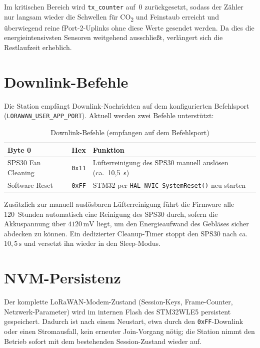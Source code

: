 Im kritischen Bereich wird \texttt{tx\_counter} auf~0 zurückgesetzt, sodass der Zähler nur langsam wieder die Schwellen für CO\textsubscript{2} und Feinstaub erreicht und überwiegend reine fPort-2-Uplinks ohne diese Werte gesendet werden. Da dies die energieintensivsten Sensoren weitgehend ausschließt, verlängert sich die Restlaufzeit erheblich.

\section*{Downlink-Befehle}

Die Station empfängt Downlink-Nachrichten auf dem konfigurierten Befehlsport (\texttt{LORAWAN\_USER\_APP\_PORT}). Aktuell werden zwei Befehle unterstützt:

\begin{table}[H]
  \centering
  \begin{tabular}{lll}
    \hline
    \textbf{Byte 0} & \textbf{Hex} & \textbf{Funktion} \\
    \hline
    SPS30 Fan Cleaning & \texttt{0x11} & Lüfterreinigung des SPS30 manuell auslösen (ca.\ 10{,}5~s) \\
    Software Reset      & \texttt{0xFF} & STM32 per \texttt{HAL\_NVIC\_SystemReset()} neu starten \\
    \hline
  \end{tabular}
  \caption{Downlink-Befehle (empfangen auf dem Befehlsport)}
  \label{tab:downlink}
\end{table}

Zusätzlich zur manuell auslösbaren Lüfterreinigung führt die Firmware alle 120~Stunden automatisch eine Reinigung des SPS30 durch, sofern die Akkuspannung über $4120\,\text{mV}$ liegt, um den Energieaufwand des Gebläses sicher abdecken zu können. Ein dedizierter Cleanup-Timer stoppt den SPS30 nach ca.\ $10{,}5\,\text{s}$ und versetzt ihn wieder in den Sleep-Modus.

\section*{NVM-Persistenz}

Der komplette LoRaWAN-Modem-Zustand (Session-Keys, Frame-Counter, Netzwerk-Parameter) wird im internen Flash des STM32WLE5 persistent gespeichert. Dadurch ist nach einem Neustart, etwa durch den \texttt{0xFF}-Downlink oder einen Stromausfall, kein erneuter Join-Vorgang nötig; die Station nimmt den Betrieb sofort mit dem bestehenden Session-Zustand wieder auf.

